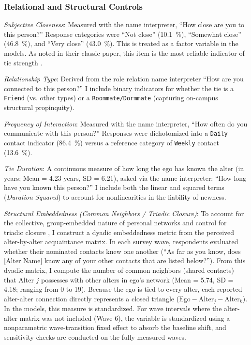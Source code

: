 \documentclass[12pt,letterpaper]{article}
\def\percent{\%}%
\begin{document}
\subsubsection{Relational and Structural Controls}

\emph{Subjective Closeness}: Measured with the name interpreter, ``How close are you to this person?'' Response categories were ``Not close'' (\SI{10.1}{\percent}), ``Somewhat close'' (\SI{46.8}{\percent}), and ``Very close'' (\SI{43.0}{\percent}). This is treated as a factor variable in the models. As \citet{marsden1984measuring-f62} noted in their classic paper, this item is the most reliable indicator of tie strength \citep{granovetter1973strength-f5f}.

\emph{Relationship Type}: Derived from the role relation name interpreter ``How are you connected to this person?'' I include binary indicators for whether the tie is a \texttt{Friend} (vs. other types) or a \texttt{Roommate/Dormmate} (capturing on-campus structural propinquity).

\emph{Frequency of Interaction}: Measured with the name interpreter, ``How often do you communicate with this person?'' Responses were dichotomized into a \texttt{Daily} contact indicator (\SI{86.4}{\percent}) versus a reference category of \texttt{Weekly} contact (\SI{13.6}{\percent}).

\emph{Tie Duration}: A continuous measure of how long the ego has known the alter (in years; Mean = 4.23 years, SD = 6.21), asked via the name interpreter: ``How long have you known this person?'' I include both the linear and squared terms (\emph{Duration Squared}) to account for nonlinearities in the liability of newness.

\emph{Structural Embeddedness (Common Neighbors / Triadic Closure)}: To account for the collective, group-embedded nature of personal networks and control for triadic closure \citep{granovetter1973strength-f5f, coleman1988}, I construct a dyadic embeddedness metric from the perceived alter-by-alter acquaintance matrix. In each survey wave, respondents evaluated whether their nominated contacts knew one another (``As far as you know, does [Alter Name] know any of your other contacts that are listed below?''). From this dyadic matrix, I compute the number of common neighbors (shared contacts) that Alter $j$ possesses with other alters in ego's network (Mean = 5.74, SD = 4.18; ranging from 0 to 19). Because the ego is tied to every alter, each reported alter-alter connection directly represents a closed triangle ($\text{Ego} - \text{Alter}_j - \text{Alter}_k$). In the models, this measure is standardized. For wave intervals where the alter-alter matrix was not included (Wave 6), the variable is standardized using a nonparametric wave-transition fixed effect to absorb the baseline shift, and sensitivity checks are conducted on the fully measured waves.
\end{document}
